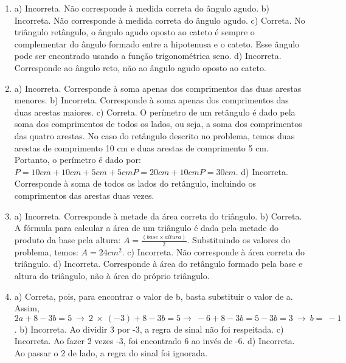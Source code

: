\begin{enumerate}
\item a) Incorreta. Não corresponde à medida correta do ângulo agudo.
b) Incorreta. Não corresponde à medida correta do ângulo agudo.
c) Correta. No triângulo retângulo, o ângulo agudo oposto ao
cateto é sempre o complementar do ângulo formado entre a hipotenusa e o
cateto. Esse ângulo pode ser encontrado usando a função trigonométrica
seno.
d) Incorreta. Corresponde ao ângulo reto, não ao ângulo agudo
oposto ao cateto.

\item a) Incorreta. Corresponde à soma apenas dos comprimentos das duas
arestas menores.
b) Incorreta. Corresponde à soma apenas dos comprimentos das duas
arestas maiores.
c) Correta. O perímetro de um retângulo é dado pela soma dos
comprimentos de todos os lados, ou seja, a soma dos comprimentos das
quatro arestas.
No caso do retângulo descrito no problema, temos duas arestas de
comprimento 10 cm e duas arestas de comprimento 5 cm. Portanto, o
perímetro é dado por: $P = 10 cm + 10 cm + 5 cm + 5 cm P = 20 cm + 10 cm P = 30 cm$. 
d) Incorreta. Corresponde à soma de todos os lados do retângulo,
incluindo os comprimentos das arestas duas vezes.

\item a) Incorreta. Corresponde à metade da área correta do triângulo.
b) Correta. A fórmula para calcular a área de um triângulo é dada
pela metade do produto da base pela altura: $A =
\frac {(base \times altura)}{2}$. Substituindo os valores do problema, temos: $A = 24 cm^2$.
c) Incorreta. Não corresponde à área correta do triângulo.
d) Incorreta. Corresponde à área do retângulo formado pela base e
altura do triângulo, não à área do próprio triângulo.

\item a) Correta, pois, para encontrar o valor de b, basta substituir o valor
de a. Assim, $2a + 8 - 3b = 5\  \rightarrow \ 2\  \times \ \left( - 3 \right) + 8 - 3b = 5 \rightarrow \  - 6 + 8 - 3b = 5 - 3b = 3\  \rightarrow \ b = \  - 1$.
b) Incorreta. Ao dividir 3 por -3, a regra de sinal não foi
respeitada.
c) Incorreta. Ao fazer 2 vezes -3, foi
encontrado 6 ao invés de -6.
d) Incorreta. Ao passar o 2 de lado, a regra do sinal foi
ignorada.
\end{enumerate}